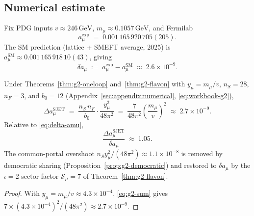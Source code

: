 \subsection{Numerical estimate}
\label{sec:g2:numeric}

Fix PDG inputs $v\approx246\,\mathrm{GeV}$, $m_\mu\approx0.1057\,\mathrm{GeV}$,
and Fermilab~\cite{MuonG2FNAL2025}
\begin{equation}\label{eq:amu-fnal}
  a_\mu^{\mathrm{exp}}
  \;=\;
  0.001\,165\,920\,705(205).
\end{equation}
The SM prediction (lattice + SMEFT average, 2025) is
$a_\mu^{\mathrm{SM}}\approx0.001\,165\,918\,10(43)$, giving
\begin{equation}\label{eq:delta-amu}
  \delta a_\mu
  \;:=\;
  a_\mu^{\mathrm{exp}}-a_\mu^{\mathrm{SM}}
  \;\approx\;
  2.6\times10^{-9}.
\end{equation}

\begin{proposition}\label{prop:g2-estimate}
Under Theorems~\ref{thm:g2-oneloop} and~\ref{thm:g2-flavon} with
$y_\mu=m_\mu/v$, $n_S=28$, $n_F=3$, and $b_0=12$
(Appendix~\ref{sec:appendix:numerical}, \eqref{eq:workbook-g2}),
\begin{equation}\label{eq:g2-numeric}
  \Delta a_\mu^{\mathrm{SJET}}
  \;=\;
  \frac{n_S\,n_F}{b_0}\cdot\frac{y_\mu^2}{48\pi^2}
  \;=\;
  \frac{7}{48\pi^2}\left(\frac{m_\mu}{v}\right)^2
  \;\approx\;
  2.7\times10^{-9}.
\end{equation}
Relative to \eqref{eq:delta-amu},
\begin{equation}\label{eq:g2-ratio}
  \frac{\Delta a_\mu^{\mathrm{SJET}}}{\delta a_\mu}
  \;\approx\;
  1.05.
\end{equation}
The common-portal overshoot
$n_S y_\mu^2/(48\pi^2)\approx1.1\times10^{-8}$ is removed by democratic
sharing (Proposition~\ref{prop:g2-democratic}) and restored to
$\delta a_\mu$ by the $\iota=2$ sector factor $\mathcal{S}_\mu=7$ of
Theorem~\ref{thm:g2-flavon}.
\end{proposition}

\begin{proof}
With $y_\mu=m_\mu/v\approx4.3\times10^{-4}$, \eqref{eq:g2-sum} gives
$7\times(4.3\times10^{-4})^2/(48\pi^2)\approx2.7\times10^{-9}$.
\end{proof}


